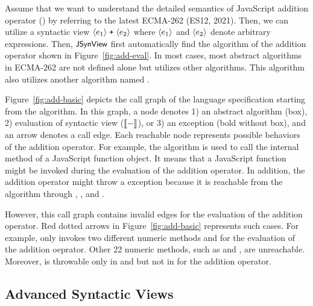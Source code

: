 Assume that we want to understand the detailed semantics of JavaScript addition
operator (\code{+}) by referring to the latest ECMA-262 (ES12, 2021).  Then, we
can utilize a syntactic view $\langle e_1 \rangle \; \texttt{+} \; \langle e_2 \rangle$
where $\langle e_1 \rangle$ and $\langle e_2 \rangle$ denote arbitrary expressions.
Then, $\textsf{\small JSynView}$ first automatically find the  algorithm of the
addition operator shown in Figure~\ref{fig:add-eval}.  In most cases, most
abstract algorithms in ECMA-262 are not defined alone but utilizes other
algorithms.  This algorithm also utilizes another algorithm named
.

Figure~\ref{fig:add-basic} depicts the call graph of the language specification
starting from the  algorithm.  In this graph, a node denotes
1) an abstract algorithm (box), 2) evaluation of syntactic view ($\llbracket{-}\rrbracket$), or
3) an exception (bold without box), and an arrow denotes a call edge. Each
reachable node represents possible behaviors of the addition operator.  For
example, the  algorithm is used to call the \eswrd{[[Call]]}
internal method of a JavaScript function object.  It means that a JavaScript
function might be invoked during the evaluation of the addition operator.  In
addition, the addition operator might throw a  exception
because it is reachable from the  algorithm through
, , and .

However, this call graph contains invalid edges for the evaluation of the
addition operator.  Red dotted arrows in Figure~\ref{fig:add-basic} represents
such cases.  For example,  only
invokes two different numeric methods  and
 for the evaluation of the addition oeprator.  Other 22
numeric methods, such as  and ,
are unreachable.  Moreover,  is throwable only in
 and  but not in  for the
addition operator.


\subsection{Advanced Syntactic Views}\label{sec:adv-syn-view}

